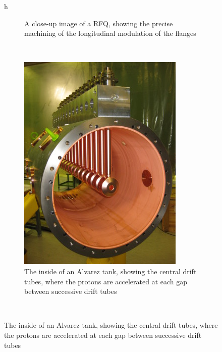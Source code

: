 \begin{figure}{h}
\begin{subfigure}[h]{0.4\textwidth}
        \caption{A close-up image of a RFQ, showing the precise
          machining of the longitudinal modulation of the flanges \cite{LHC:LHC_linac2_rfq_image}}\label{fig:rfq_actual}
      \end{subfigure}
      ~ %
      \begin{subfigure}[h]{0.4\textwidth}
        \includegraphics[width=\textwidth]{Figures/LHC_Diagrams/LHC__Linac2__AlvarezTube_Inside__DTL_proto_assembled_image.jpg}
        \caption{The inside of an Alvarez tank, showing the central
          drift tubes, where the protons are accelerated at each gap
          between successive drift tubes \cite{LHC:LHC_linac2_alvarezChambersInside_image}}\label{fig:alvarez_tank_inside}
      \end{subfigure}
      ~ %

\end{figure}
